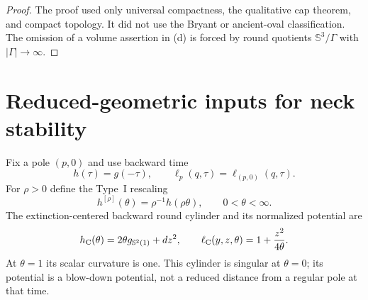 \documentclass[10pt]{coll-l}
\newcommand{\Sph}{\mathbb{S}}
\theoremstyle{definition}
\theoremstyle{remark}
\numberwithin{section}{chapter}
\numberwithin{equation}{chapter}
\begin{document}
\begin{proof}
The proof used only universal compactness, the qualitative cap theorem,
and compact topology.  It did not use the Bryant or ancient-oval
classification.  The omission of a volume assertion in (d) is forced by
round quotients $\Sph^3/\Gamma$ with $|\Gamma|\to\infty$.
\end{proof}

\section{Reduced-geometric inputs for neck stability}
\label{sec:ncs-stability-inputs}

Fix a pole $(p,0)$ and use backward time
\begin{equation}
 h(\tau)=g(-\tau),\qquad
 \ell_p(q,\tau)=\ell_{(p,0)}(q,\tau).                  \label{eq:ncs-backward-notation}
\end{equation}
For $\rho>0$ define the Type~I rescaling
\begin{equation}
 h^{[\rho]}(\theta)=\rho^{-1}h(\rho\theta),\qquad
                         0<\theta<\infty.              \label{eq:ncs-TypeI-backward-rescaling}
\end{equation}
The extinction-centered backward round cylinder and its normalized
potential are
\begin{equation}
 h_{\rm C}(\theta)=2\theta g_{\Sph^2(1)}+dz^2,\qquad
 \ell_{\rm C}(y,z,\theta)=1+\frac{z^2}{4\theta}.       \label{eq:ncs-extinction-cylinder-triple}
\end{equation}
At $\theta=1$ its scalar curvature is one.  This cylinder is singular at
$\theta=0$; its potential is a blow-down potential, not a reduced distance
from a regular pole at that time.
\end{document}
